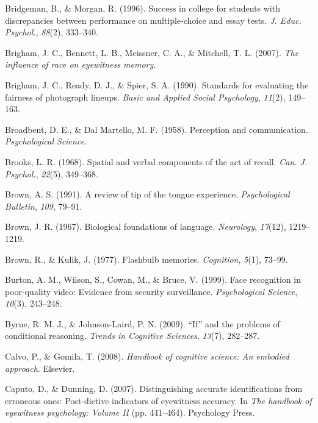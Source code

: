 \documentclass[
]{krantz}
\newlength{\cslhangindent}
\newenvironment{CSLReferences}[2] %
 {\begin{list}{}{%
  \setlength{\itemindent}{0pt}
  \setlength{\leftmargin}{0pt}
  \setlength{\parsep}{0pt}
  \ifodd #1
   \setlength{\leftmargin}{\cslhangindent}
   \setlength{\itemindent}{-1\cslhangindent}
  \fi
  \setlength{\itemsep}{#2\baselineskip}}}
 {\end{list}}
\begin{document}
\begin{CSLReferences}{1}{0}
Bridgeman, B., \& Morgan, R. (1996). Success in college for students with discrepancies between performance on multiple-choice and essay tests. \emph{J. Educ. Psychol.}, \emph{88}(2), 333--340.

Brigham, J. C., Bennett, L. B., Meissner, C. A., \& Mitchell, T. L. (2007). \emph{The influence of race on eyewitness memory.}

Brigham, J. C., Ready, D. J., \& Spier, S. A. (1990). Standards for evaluating the fairness of photograph lineups. \emph{Basic and Applied Social Psychology}, \emph{11}(2), 149--163.

Broadbent, D. E., \& Dal Martello, M. F. (1958). Perception and communication. \emph{Psychological Science}.

Brooks, L. R. (1968). Spatial and verbal components of the act of recall. \emph{Can. J. Psychol.}, \emph{22}(5), 349--368.

Brown, A. S. (1991). A review of tip of the tongue experience. \emph{Psychological Bulletin}, \emph{109}, 79--91.

Brown, J. R. (1967). Biological foundations of language. \emph{Neurology}, \emph{17}(12), 1219--1219.

Brown, R., \& Kulik, J. (1977). Flashbulb memories. \emph{Cognition}, \emph{5}(1), 73--99.

Burton, A. M., Wilson, S., Cowan, M., \& Bruce, V. (1999). Face recognition in poor-quality video: Evidence from security surveillance. \emph{Psychological Science}, \emph{10}(3), 243--248.

Byrne, R. M. J., \& Johnson-Laird, P. N. (2009). {``If''} and the problems of conditional reasoning. \emph{Trends in Cognitive Sciences}, \emph{13}(7), 282--287.

Calvo, P., \& Gomila, T. (2008). \emph{Handbook of cognitive science: An embodied approach}. Elsevier.

Caputo, D., \& Dunning, D. (2007). Distinguishing accurate identifications from erroneous ones: Post-dictive indicators of eyewitness accuracy. In \emph{The handbook of eyewitness psychology: Volume II} (pp. 441--464). Psychology Press.


\end{CSLReferences}
\end{document}
